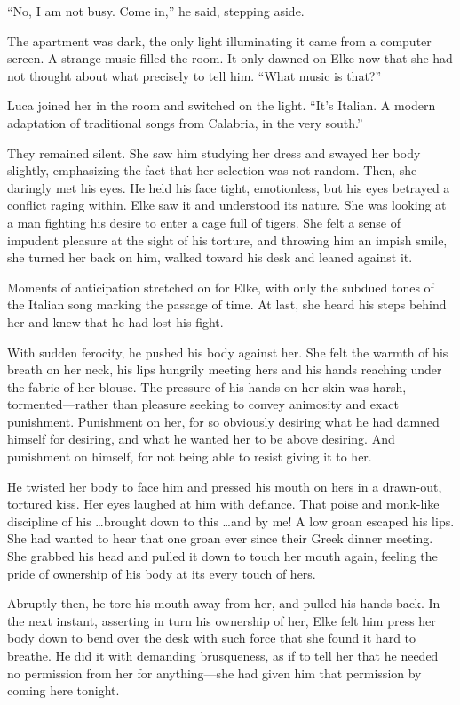 ``No, I am not busy. Come in,'' he said, stepping aside.

The apartment was dark, the only light illuminating it came from a computer screen. A strange music filled the room. It only dawned on Elke now that she had not thought about what precisely to tell him. ``What music is that?''

Luca joined her in the room and switched on the light. ``It's Italian. A modern adaptation of traditional songs from Calabria, in the very south.''

They remained silent. She saw him studying her dress and swayed her body slightly, emphasizing the fact that her selection was not random. Then, she daringly met his eyes. He held his face tight, emotionless, but his eyes betrayed a conflict raging within. Elke saw it and understood its nature. She was looking at a man fighting his desire to enter a cage full of tigers. She felt a sense of impudent pleasure at the sight of his torture, and throwing him an impish smile, she turned her back on him, walked toward his desk and leaned against it.

Moments of anticipation stretched on for Elke, with only the subdued tones of the Italian song marking the passage of time. At last, she heard his steps behind her and knew that he had lost his fight.

With sudden ferocity, he pushed his body against her. She felt the warmth of his breath on her neck, his lips hungrily meeting hers and his hands reaching under the fabric of her blouse. The pressure of his hands on her skin was harsh, tormented---rather than pleasure seeking to convey animosity and exact punishment. Punishment on her, for so obviously desiring what he had damned himself for desiring, and what he wanted her to be above desiring. And punishment on himself, for not being able to resist giving it to her.

He twisted her body to face him and pressed his mouth on hers in a drawn-out, tortured kiss. Her eyes laughed at him with defiance. That poise and monk-like discipline of his \ldots brought down to this \ldots and by me! A low groan escaped his lips. She had wanted to hear that one groan ever since their Greek dinner meeting. She grabbed his head and pulled it down to touch her mouth again, feeling the pride of ownership of his body at its every touch of hers.

Abruptly then, he tore his mouth away from her, and pulled his hands back. In the next instant, asserting in turn his ownership of her, Elke felt him press her body down to bend over the desk with such force that she found it hard to breathe. He did it with demanding brusqueness, as if to tell her that he needed no permission from her for anything---she had given him that permission by coming here tonight.

